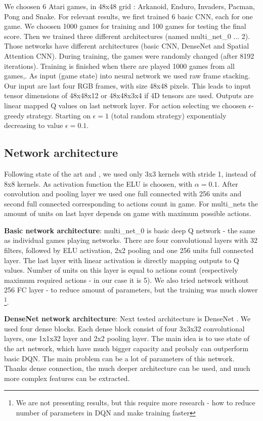 \documentclass[10pt,a4paper]{article}
\begin{document}
We choosen 6 Atari games, in 48x48 grid : Arkanoid, Enduro, Invaders, Pacman, Pong and Snake.
For relevant results, we first trained 6 basic CNN, each for one game. We choosen 1000 games for training and 100 games for testing the final score.
Then we trained three different architectures (named multi\_net\_0 ... 2). Those networks have different architectures (basic CNN, DenseNet and Spatial Attention CNN).
During training, the games were randomly changed (after 8192 iterations). Training is finished when there are played 1000 games from all games,.
As input (game state) into neural network we used raw frame stacking. Our input are last four RGB frames, with size 48x48 pixels. This leads to input tensor dimensions of 48x48x12 or 48x48x3x4 if
4D tensors are used. Outputs are linear mapped Q values on last network layer.
For action selecting we choosen $\epsilon$-greedy strategy. Starting on $\epsilon = 1$ (total random strategy) exponentialy decreasing to value $\epsilon = 0.1$.

\subsection {Network architecture}
Following state of the art \cite{bib:vgg_net} and \cite{bib:resnet_net}, we used only 3x3 kernels with stride 1, instead of \cite{bib:dqn_atari} 8x8 kernels.
As activation function the ELU is choosen, with $\alpha = 0.1$. After convolution and pooling layer we used one full connected with 256 units and second
full connected corresponding to actions count in game. For multi\_nets the amount of units on last layer depends on game with maximum possible actions.

{\bf Basic network architecture}:
multi\_net\_0 is basic deep Q network - the same as individual games playing networks.
There are four convolutional layers with 32 filters, followed by ELU activation, 2x2 pooling and one 256 units full connected layer.
The last layer with linear activation is directly mapping outputs to Q values. Number of units on this layer is equal to actions count
(respectively maximum required actions - in our case it is 5).
We also tried network without 256 FC layer - to reduce amount of parameters, but the training was much slower \footnote {We are not presenting results, but this require more research - how to reduce number of parameters in DQN and make training faster}.

{\bf DenseNet network architecture}:
Next tested architecture is DenseNet \cite{bib:densenet_net}. We used four dense blocks. Each dense block consist of four 3x3x32 convolutional layers, one 1x1x32 layer and 2x2 pooling layer.
The main idea is to use state of the art network, which have much bigger capacity and probaly can outperform basic DQN. The main problem can be a lot
of parameters of this network. Thanks dense connection, the much deeper architecture can be used, and much more complex features can be extracted.
\end{document}
